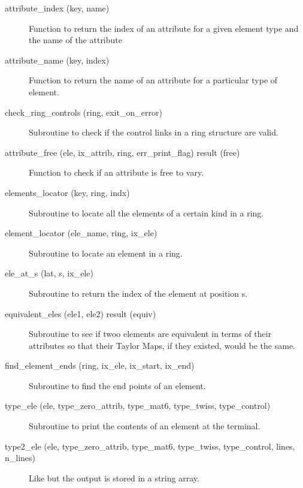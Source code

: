 \begin{description}

\item[attribute\_index (key, name)] \Newline
Function to return the index of an attribute for a given element 
type and the name of the attribute 

\item[attribute\_name (key, index)] \Newline
Function to return the name of an attribute for a particular type of element. 

\item[check\_ring\_controls (ring, exit\_on\_error)] \Newline
Subroutine to check if the control links in a ring structure are valid. 

\item[attribute\_free (ele, ix\_attrib, ring, err\_print\_flag) result (free)] \Newline
Function to check if an attribute is free to vary.

\item[elements\_locator (key, ring, indx)] \Newline
Subroutine to locate all the elements of a certain kind in a ring. 

\item[element\_locator (ele\_name, ring, ix\_ele)] \Newline
Subroutine to locate an element in a ring. 

\item[ele\_at\_s (lat, s, ix\_ele)] \Newline 
Subroutine to return the index of the element at position s.

\item[equivalent\_eles (ele1, ele2) result (equiv)] \Newline 
Subroutine to see if twoo elements are equivalent in terms of their attributes so
that their Taylor Maps, if they existed, would be the same.

\item[find\_element\_ends (ring, ix\_ele, ix\_start, ix\_end)] \Newline
Subroutine to find the end points of an element. 

\item[type\_ele (ele, type\_zero\_attrib, type\_mat6, type\_twiss, 
type\_control)] \Newline
Subroutine to print the contents of an element at the terminal. 

\item[type2\_ele (ele, type\_zero\_attrib, type\_mat6, type\_twiss, 
type\_control, lines, n\_lines)] \Newline
Like  but the output is stored in a string array. 


\end{description}
